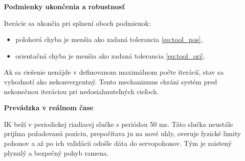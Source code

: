 \textbf{Podmienky ukončenia a robustnosť}

Iterácie sa ukončia pri splnení oboch podmienok:
\begin{itemize}
	\item polohová chyba je menšia ako zadaná tolerancia \eqref{eq:tool_pos},
	\item orientačná chyba je menšia ako zadaná tolerancia \eqref{eq:tool_ori}.
\end{itemize}

Ak sa riešenie nenájde v definovanom maximálnom počte iterácií, stav sa vyhodnotí ako nekonvergentný. Tento mechanizmus chráni systém pred nekonečnou iteráciou pri nedosiahnuteľných cieľoch.

\textbf{Prevádzka v reálnom čase}

IK beží v periodickej riadiacej slučke s periódou 50 ms. Táto slučka neustále prijíma požadovanú pozíciu, prepočítava ju na nové uhly, overuje fyzické limity pohonov a až po ich validácii odošle dáta do servopohonov. Tým je zaistený plynulý a bezpečný pohyb ramena.
